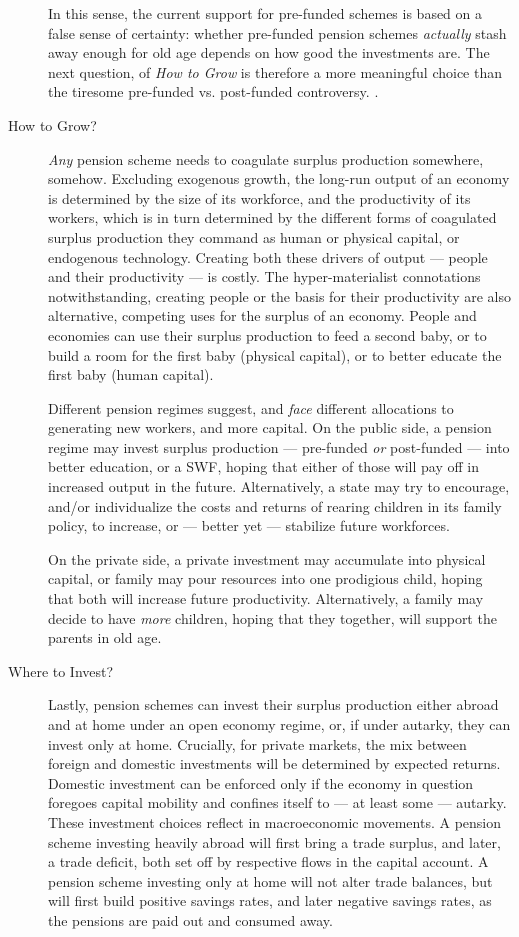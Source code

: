 \documentclass[11pt,a4paper,oneside]{article}
\begin{document}
\begin{description}
{		In this sense, the current support for pre-funded schemes is based on a false sense of certainty: 
		whether pre-funded pension schemes \emph{actually} stash away enough for old age depends on how good the investments are. 
		The next question, of \emph{How to Grow} is therefore a more meaningful choice than the tiresome pre-funded vs. post-funded controversy.
	}. 
	\item[How to Grow?] \emph{Any} pension scheme needs to coagulate surplus production somewhere, somehow. 
	Excluding exogenous growth, the long-run output of an economy is determined by the size of its workforce, and the productivity of its workers, which is in turn determined by the different forms of coagulated surplus production they command as human or physical capital, or endogenous technology. 
	Creating both these drivers of output --- people and their productivity --- is costly. 
	The hyper-materialist connotations notwithstanding, creating people or the basis for their productivity are also alternative, competing uses for the surplus of an economy. 
	People and economies can use their surplus production to feed a second baby, or to build a room for the first baby (physical capital), or to better educate the first baby (human capital).
	
	Different pension regimes suggest, and \emph{face} different allocations to generating new workers, and more capital. 
	On the public side, a pension regime may invest surplus production --- pre-funded \emph{or} post-funded --- into better education, or a \gls{SWF}, hoping that either of those will pay off in increased output in the future. 
	Alternatively, a state may try to encourage, and/or individualize the costs and returns of rearing children in its family policy, to increase, or --- better yet --- stabilize future workforces.
	
	On the private side, a private investment may accumulate into physical capital, or family may pour resources into one prodigious child, hoping that both will increase future productivity. 
	Alternatively, a family may decide to have \emph{more} children, hoping that they together, will support the parents in old age.
	
	\item[Where to Invest?] Lastly, pension schemes can invest their surplus production either abroad and at home under an open economy regime, or, if under autarky, they can invest only at home. 
	Crucially, for private markets, the mix between foreign and domestic investments will be determined by expected returns. 
	Domestic investment can be enforced only if the economy in question foregoes capital mobility and confines itself to --- at least some --- autarky. \\
	These investment choices reflect in macroeconomic movements. 
	A pension scheme investing heavily abroad will first bring a trade surplus, and later, a trade deficit, both set off by respective flows in the capital account. 
	A pension scheme investing only at home will not alter trade balances, but will first build positive savings rates, and later negative savings rates, as the pensions are paid out and consumed away.
\end{description}
\end{document}
